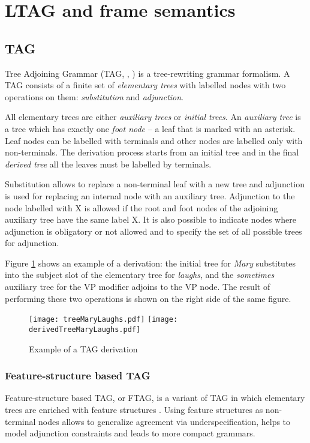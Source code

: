 \section{LTAG and frame semantics}
\subsection{TAG}\label{section:tag}
Tree Adjoining Grammar (TAG, \citealt{JoshiSchabes:97}, \citealt{AbeilleRambow:00}) is a tree-rewriting grammar formalism. A TAG consists of a finite set of \textit{elementary trees} with labelled nodes with two operations on them: \textit{substitution} and \textit{adjunction}. 

All elementary trees are either \textit{auxiliary trees} or \textit{initial trees}. An \textit{auxiliary tree} is a tree which has exactly one \textit{foot node} -- a leaf that is marked with an asterisk. Leaf nodes can be labelled with terminals and other nodes are labelled only with non-terminals. The derivation process starts from an initial tree and in the final \textit{derived tree} all the leaves must be labelled by terminals.

Substitution allows to replace a non-terminal leaf with a new tree and adjunction is used for replacing an internal node with an auxiliary tree. Adjunction to the node labelled with X is allowed if the root and foot nodes of the adjoining auxiliary tree have the same label X. It is also possible to indicate nodes where adjunction is obligatory or not allowed and to specify the set of all possible trees for adjunction.

Figure \ref{fig:exampletree} shows an example of a derivation: the initial tree for \textit{Mary} substitutes into the subject slot of the elementary tree for \textit{laughs}, and the \textit{sometimes} auxiliary tree for the VP modifier adjoins to the VP node. The result of performing these two operations is shown on the right side of the same figure.

\begin{figure}[h!]
	\centering
	\hspace{-0.6cm}    
    \texttt{[image: treeMaryLaughs.pdf]} 
    \hspace{0.4cm}
    \texttt{[image: derivedTreeMaryLaughs.pdf]} 
    \caption{Example of a TAG derivation}
    \label{fig:exampletree}
\end{figure}

\subsubsection{Feature-structure based TAG} 
Feature-structure based TAG, or FTAG, is a variant of TAG in which elementary trees are enriched with feature structures \citep{Vijay-ShankerJoshi:88}. Using feature structures as non-terminal nodes allows to generalize agreement via underspecification, helps to model adjunction constraints and leads to more compact grammars.


